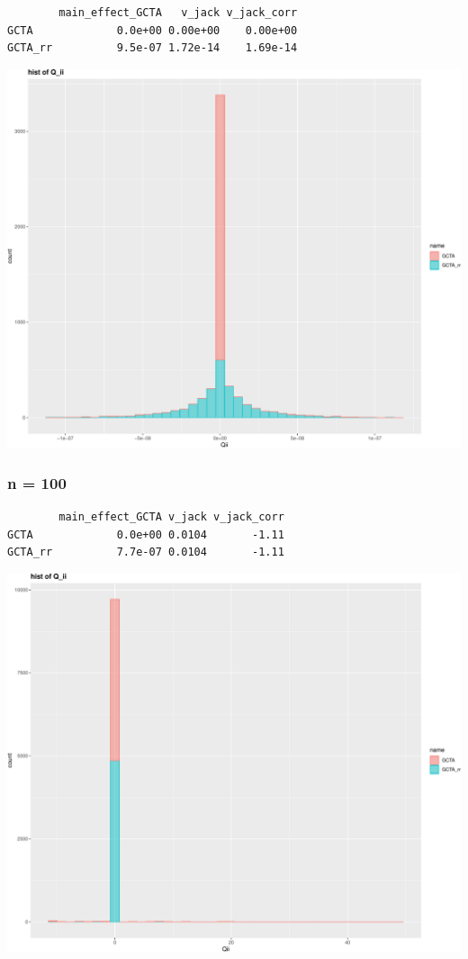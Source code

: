 \documentclass[]{article}
\begin{document}
\begin{verbatim}
        main_effect_GCTA   v_jack v_jack_corr
GCTA             0.0e+00 0.00e+00    0.00e+00
GCTA_rr          9.5e-07 1.72e-14    1.69e-14
\end{verbatim}

\includegraphics{GCTA_and_rr_v_jack_correction_files/figure-latex/unnamed-chunk-9-1.pdf}
\newpage

\subsubsection{n = 100}\label{n-100-1}

\begin{verbatim}
        main_effect_GCTA v_jack v_jack_corr
GCTA             0.0e+00 0.0104       -1.11
GCTA_rr          7.7e-07 0.0104       -1.11
\end{verbatim}

\includegraphics{GCTA_and_rr_v_jack_correction_files/figure-latex/unnamed-chunk-10-1.pdf}
\newpage
\end{document}

